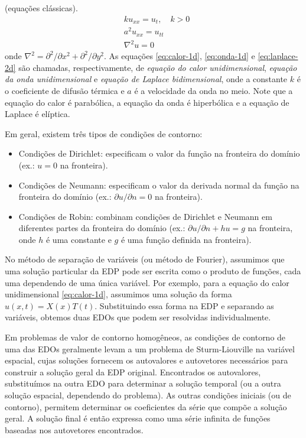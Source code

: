 \documentclass{article}
\begin{document}
\begin{defn} (equações clássicas).
    \begin{align}
        &k u_{xx} = u_t, \quad k>0 \label{eq:calor-1d} \\
        &a^2 u_{xx} = u_{tt} \label{eq:onda-1d} \\
        &\nabla^2 u = 0 \label{eq:laplace-2d}
    \end{align}
    \noindent onde \(\nabla^2 = \partial^2/\partial x^2 + \partial^2/\partial y^2\).
    As equações \eqref{eq:calor-1d}, \eqref{eq:onda-1d} e \eqref{eq:laplace-2d} são chamadas, respectivamente, de \emph{equação do calor unidimensional}, \emph{equação da onda unidimensional} e \emph{equação de Laplace bidimensional}, onde a constante \(k\) é o coeficiente de difusão térmica e \(a\) é a velocidade da onda no meio.
    Note que a equação do calor é parabólica, a equação da onda é hiperbólica e a equação de Laplace é elíptica.
\end{defn}

\begin{rem}
    Em geral, existem três tipos de condições de contorno:
    \begin{itemize}
        \item[(i)] Condições de Dirichlet: especificam o valor da função na fronteira do domínio (ex.: \(u=0\) na fronteira).
        \item[(ii)] Condições de Neumann: especificam o valor da derivada normal da função na fronteira do domínio (ex.: \(\partial u/\partial n=0\) na fronteira).
        \item[(iii)] Condições de Robin: combinam condições de Dirichlet e Neumann em diferentes partes da fronteira do domínio (ex.: \(\partial u/\partial n + hu = g\) na fronteira, onde \(h\) é uma constante e \(g\) é uma função definida na fronteira).
    \end{itemize}
\end{rem}

No método de separação de variáveis (ou método de Fourier), assumimos que uma solução particular da EDP pode ser escrita como o produto de funções, cada uma dependendo de uma única variável. Por exemplo, para a equação do calor unidimensional \eqref{eq:calor-1d}, assumimos uma solução da forma \(u(x,t) = X(x)T(t)\). Substituindo essa forma na EDP e separando as variáveis, obtemos duas EDOs que podem ser resolvidas individualmente.

Em problemas de valor de contorno homogêneos, as condições de contorno de uma das EDOs geralmente levam a um problema de Sturm-Liouville na variável espacial, cujas soluções fornecem os autovalores e autovetores necessários para construir a solução geral da EDP original. Encontrados os autovalores, substituímos na outra EDO para determinar a solução temporal (ou a outra solução espacial, dependendo do problema). As outras condições iniciais (ou de contorno), permitem determinar os coeficientes da série que compõe a solução geral. A solução final é então expressa como uma série infinita de funções baseadas nos autovetores encontrados.
\end{document}
